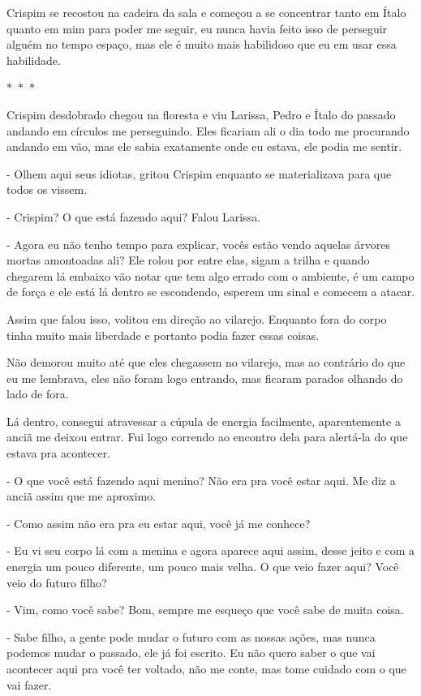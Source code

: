 Crispim se recostou na cadeira da sala e começou a se concentrar tanto em Ítalo quanto em mim para poder me seguir, eu nunca havia feito isso de perseguir alguém no tempo espaço, mas ele é muito mais habilidoso que eu em usar essa habilidade.

\begin{center}
  $\ast$~$\ast$~$\ast$
\end{center}
  
Crispim desdobrado chegou na floresta e viu Larissa, Pedro e Ítalo do passado andando em círculos me perseguindo. Eles ficariam ali o dia todo me procurando andando em vão, mas ele sabia exatamente onde eu estava, ele podia me sentir.

- Olhem aqui seus idiotas, gritou Crispim enquanto se materializava para que todos os vissem. 

- Crispim? O que está fazendo aqui? Falou Larissa.

- Agora eu não tenho tempo para explicar, vocês estão vendo aquelas árvores mortas amontoadas ali? Ele rolou por entre elas, sigam a trilha e quando chegarem lá embaixo vão notar que tem algo errado com o ambiente, é um campo de força e ele está lá dentro se escondendo, esperem um sinal e comecem a atacar.

Assim que falou isso, volitou em direção ao vilarejo. Enquanto fora do corpo tinha muito mais liberdade e portanto podia fazer essas coisas.

Não demorou muito até que eles chegassem no vilarejo, mas ao contrário do que eu me lembrava, eles não foram logo entrando, mas ficaram parados olhando do lado de fora.

Lá dentro, consegui atravessar a cúpula de energia facilmente, aparentemente a anciã me deixou entrar. Fui logo correndo ao encontro dela para alertá-la do que estava pra acontecer.

- O que você está fazendo aqui menino? Não era pra você estar aqui. Me diz a anciã assim que me aproximo.

- Como assim não era pra eu estar aqui, você já me conhece?

- Eu vi seu corpo lá com a menina e agora aparece aqui assim, desse jeito e com a energia um pouco diferente, um pouco mais velha. O que veio fazer aqui? Você veio do futuro filho?

- Vim, como você sabe? Bom, sempre me esqueço que você sabe de muita coisa.

- Sabe filho, a gente pode mudar o futuro com as nossas ações, mas nunca podemos mudar o passado, ele já foi escrito. Eu não quero saber o que vai acontecer aqui pra você ter voltado, não me conte, mas tome cuidado com o que vai fazer.

